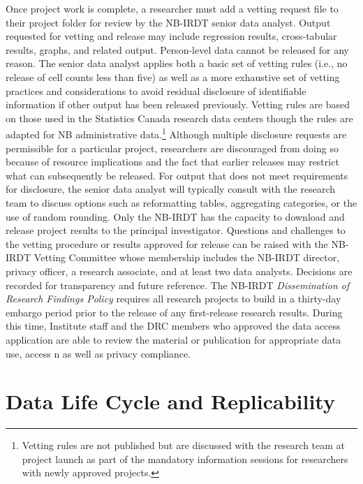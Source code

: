 Once project work is complete, a researcher must add a vetting request file to their project folder for review by the NB-IRDT senior data analyst. Output requested for vetting and release may include regression results, cross-tabular results, graphs, and related output. Person-level data cannot be released for any reason. The senior data analyst applies both a basic set of vetting rules (i.e., no release of cell counts less than five) as well as a more exhaustive set of vetting practices and considerations to avoid residual disclosure of identifiable information if other output has been released previously. Vetting rules are based on those used in the Statistics Canada research data centers though the rules are adapted for NB administrative data.\footnote{Vetting rules are not published but are discussed with the research team at project launch as part of the mandatory information sessions for researchers with newly approved projects.} Although multiple disclosure requests are permissible for a particular project, researchers are discouraged from doing so because of resource implications and the fact that earlier releases may restrict what can subsequently be released. For output that does not meet requirements for disclosure, the senior data analyst will typically consult with the research team to discuss options such as reformatting tables, aggregating categories, or the use of random rounding. Only the NB-IRDT has the capacity to download and release project results to the principal investigator. Questions and challenges to the vetting procedure or results approved for release can be raised with the NB-IRDT Vetting Committee whose membership includes the NB-IRDT director, privacy officer, a research associate, and at least two data analysts. Decisions are recorded for transparency and future reference. The NB-IRDT \emph{Dissemination of Research Findings Policy} requires all research projects to build in a thirty-day embargo period prior to the release of any first-release research results. During this time, Institute staff and the DRC members who approved the data access application are able to review the material or publication for appropriate data use, access n as well as privacy compliance.

\hypertarget{nbirdt-replicability}{%
\section{Data Life Cycle and Replicability}\label{nbirdt-replicability}}

